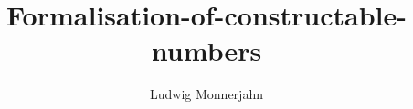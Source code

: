 \documentclass{report}
\title{Formalisation-of-constructable-numbers}
\author{Ludwig Monnerjahn}
\begin{document}
\maketitle


\nocite{*}
\end{document}
